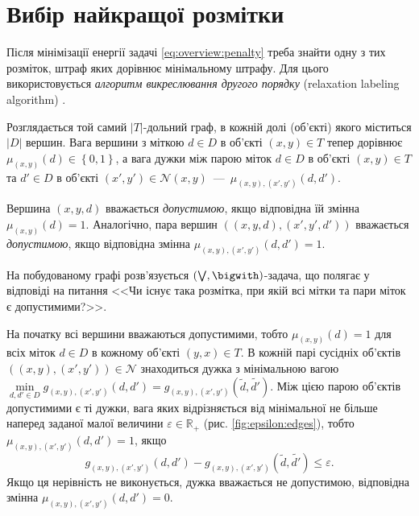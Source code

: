 \section{Вибір найкращої розмітки}

Після мінімізації енергії задачі \eqref{eq:overview:penalty}
треба знайти одну з тих розміток, штраф яких дорівнює мінімальному штрафу.
Для цього використовується \textit{алгоритм викреслювання другого порядку}
(relaxation labeling algorithm) \cite{overview:savchynskyy:diffusion}.

Розглядається той самий $\left| T \right|$-дольний граф,
в кожній долі (об'єкті) якого міститься $\left| D \right|$ вершин.
Вага вершини з міткою $d \in D$ в об'єкті $\left(x, y \right) \in T$
тепер дорівнює
$\mu_{\left(x, y \right)} \left( d \right) \in \left\{ 0, 1 \right\}$,
а вага дужки між парою міток $d \in D$ в об'єкті $\left( x, y \right) \in T$
та $d' \in D$ в об'єкті $\left(x', y' \right) \in \mathcal{N} \left(x, y \right)$~---~$\mu_{\left(x, y \right), \left(x', y' \right)} \left(d, d' \right)$.

Вершина $\left(x, y, d \right)$ вважається \textit{допустимою},
якщо відповідна їй змінна $\mu_{\left(x, y \right)} \left( d \right) = 1$.
Аналогічно,
пара вершин $\left( \left( x, y, d \right), \left(x', y', d' \right) \right)$
вважається \textit{допустимою}, якщо відповідна змінна
$\mu_{\left(x, y \right), \left(x', y' \right)} \left(d, d' \right) = 1$.

На побудованому графі розв'язується
$\left( \bigvee, \bigwith \right)$-задача, що полягає у відповіді на питання
<<Чи існує така розмітка, при якій всі мітки та пари міток є допустимими?>>.

На початку всі вершини вважаються допустимими, тобто
$\mu_{\left(x, y \right)} \left(d \right) = 1$ для всіх
міток $d \in D$ в кожному об'єкті $\left(y,x \right) \in T$.
В кожній парі сусідніх об'єктів
$\left( \left(x, y \right), \left(x', y' \right) \right) \in \mathcal{N}$
знаходиться дужка з мінімальною вагою
$\min \limits_{d, d' \in D} g_{\left(x, y \right), \left(x', y' \right)}
    \left(d, d' \right) =
    g_{\left(x, y \right), \left(x', y' \right)}
        \left(\tilde{d}, \tilde{d'} \right)$.
Між цією парою об'єктів допустимими є ті дужки,
вага яких відрізняється від мінімальної не більше
наперед заданої малої величини $\varepsilon \in \mathbb{R}_+$
(рис. \ref{fig:epsilon:edges}), тобто
$\mu_{\left(x, y \right), \left(x', y' \right)} \left(d, d' \right) = 1$,
якщо
\begin{equation*}
    g_{\left(x, y \right), \left(x', y' \right)} \left(d, d' \right) -
    g_{\left(x, y \right), \left(x', y' \right)}
        \left(\tilde{d}, \tilde{d'} \right) \le
    \varepsilon.
\end{equation*}
Якщо ця нерівність не виконується, дужка вважається не допустимою,
відповідна змінна
$\mu_{\left(x, y \right), \left(x', y' \right)} \left(d, d' \right) = 0$.

